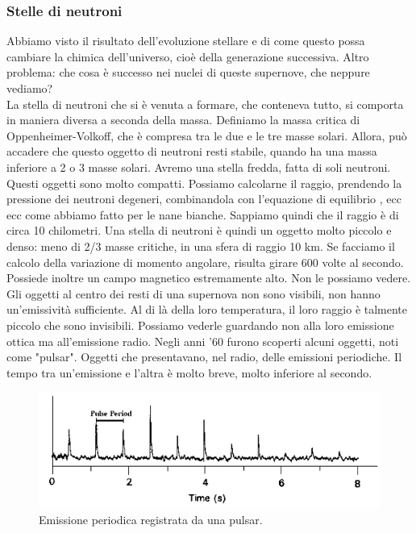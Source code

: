 \documentclass[a4paper,11pt]{article}
\begin{document}
\subsubsection{Stelle di neutroni}
Abbiamo visto il risultato dell'evoluzione stellare e di come questo possa cambiare la chimica dell'universo, cioè della generazione successiva. Altro problema: che cosa è successo nei nuclei di queste supernove, che neppure vediamo?\\
La stella di neutroni che si è venuta a formare, che conteneva tutto, si comporta in maniera diversa a seconda della massa. Definiamo la massa critica di Oppenheimer-Volkoff, che è compresa tra le due e le tre masse solari. Allora, può accadere che questo oggetto di neutroni resti stabile, quando ha una massa inferiore a 2 o 3 masse solari. Avremo una stella fredda, fatta di soli neutroni. Questi oggetti sono molto compatti. Possiamo calcolarne il raggio, prendendo la pressione dei neutroni degeneri, combinandola con l'equazione di equilibrio , ecc ecc come abbiamo fatto per le nane bianche. Sappiamo quindi che il raggio è di circa 10 chilometri. Una stella di neutroni è quindi un oggetto molto piccolo e denso: meno di 2/3 masse critiche, in una sfera di raggio 10 km. Se facciamo il calcolo della variazione di momento angolare, risulta girare 600 volte al secondo. Possiede inoltre un campo magnetico estremamente alto. Non le possiamo vedere. Gli oggetti al centro dei resti di una supernova non sono visibili, non hanno un'emissività sufficiente. Al di là della loro temperatura, il loro raggio è talmente piccolo che sono invisibili. Possiamo vederle guardando non alla loro emissione ottica ma all'emissione radio. Negli anni '60 furono scoperti alcuni oggetti, noti come "pulsar". Oggetti che presentavano, nel radio, delle emissioni periodiche. Il tempo tra un'emissione e l'altra è molto breve, molto inferiore al secondo.
\begin{figure}[h!!]
        \centering
        \includegraphics[width=12cm]{lezione 28 novembre/emissione periodica.png}
        \caption{Emissione periodica registrata da una pulsar.}
        \label{lezione 28 novembre/emissione periodica.png}
    \end{figure}
\end{document}
